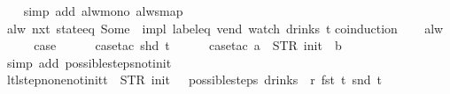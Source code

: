\begin{isabellebody}
\ \ \isamarkupfalse%
\ {\isacharparenleft}simp\ add{\isacharcolon}\ alw{\isacharunderscore}mono\ alw{\isacharunderscore}smap{\isacharparenright}%
\endisatagproof
{\isafoldproof}%
%
\isadelimproof
\isanewline
%
\endisadelimproof
\isanewline
{}\isamarkupfalse%
\ {\isachardoublequoteopen}alw\ {\isacharparenleft}nxt\ {\isacharparenleft}state{\isacharunderscore}eq\ {\isacharparenleft}Some\ {}{\isacharparenright}{\isacharparenright}\ impl\ {\isacharparenleft}label{\isacharunderscore}eq\ {\isacharprime}{\isacharprime}vend{\isacharprime}{\isacharprime}{\isacharparenright}{\isacharparenright}\ {\isacharparenleft}watch\ drinks\ t{\isacharparenright}{\isachardoublequoteclose}\isanewline
%
\isadelimproof
%
\endisadelimproof
%
\isatagproof
{}\isamarkupfalse%
{\isacharparenleft}coinduction{\isacharparenright}\isanewline
\ \ \isamarkupfalse%
\ alw\isanewline
\ \ \isamarkupfalse%
\ \isamarkupfalse%
\ {\isacharquery}case\isanewline
\ \ \ \ \isamarkupfalse%
\ {\isacharparenleft}case{\isacharunderscore}tac\ {\isachardoublequoteopen}shd\ t{\isachardoublequoteclose}{\isacharparenright}\isanewline
\ \ \ \ \isamarkupfalse%
\ {\isacharparenleft}case{\isacharunderscore}tac\ {\isachardoublequoteopen}a\ {\isacharequal}\ STR\ {\isacharprime}{\isacharprime}init{\isacharprime}{\isacharprime}\ {\isasymand}\ b\ {\isacharequal}\ {\isacharbrackleft}{\isacharbrackright}{\isachardoublequoteclose}{\isacharparenright}\isanewline
\ \ \ \ \ \isamarkupfalse%
\isanewline
\ \ \ \ \ \isamarkupfalse%
\ {\isacharparenleft}simp\ add{\isacharcolon}\ possible{\isacharunderscore}steps{\isacharunderscore}not{\isacharunderscore}init{\isacharparenright}\isanewline
\ \ \ \ \isamarkupfalse%
%
\endisatagproof
{\isafoldproof}%
%
\isadelimproof
\isanewline
%
\endisadelimproof
\isanewline
{}\isamarkupfalse%
\ ltl{\isacharunderscore}step{\isacharunderscore}none{\isacharunderscore}not{\isacharunderscore}init{\isacharcolon}{\isachardoublequoteopen}t\ {\isasymnoteq}\ {\isacharparenleft}STR\ {\isacharprime}{\isacharprime}init{\isacharprime}{\isacharprime}{\isacharcomma}\ {\isacharbrackleft}{\isacharbrackright}{\isacharparenright}\ {\isasymLongrightarrow}\ possible{\isacharunderscore}steps\ drinks\ {}\ r\ {\isacharparenleft}fst\ t{\isacharparenright}\ {\isacharparenleft}snd\ t{\isacharparenright}\ {\isacharequal}\ {\isacharbraceleft}{\isacharbar}{\isacharbar}{\isacharbraceright}{\isachardoublequoteclose}\isanewline

\end{isabellebody}
